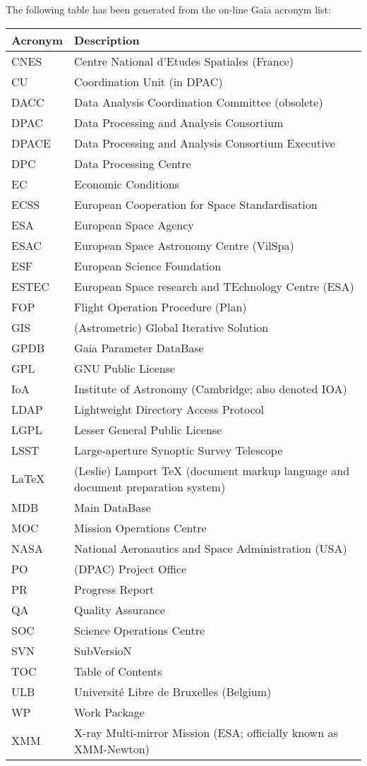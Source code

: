 The following table has been generated from the on-line Gaia acronym list:
\newline\newline%
\addtocounter{table}{-1}
\begin{longtable}{|l|p{}|}\hline 
\textbf{Acronym} & \textbf{Description}  \\\hline
CNES&Centre National d'Etudes Spatiales (France) \\\hline
CU&Coordination Unit (in DPAC) \\\hline
DACC&Data Analysis Coordination Committee (obsolete) \\\hline
DPAC&Data Processing and Analysis Consortium \\\hline
DPACE&Data Processing and Analysis Consortium Executive \\\hline
DPC&Data Processing Centre \\\hline
EC&Economic Conditions \\\hline
ECSS&European Cooperation for Space Standardisation \\\hline
ESA&European Space Agency \\\hline
ESAC&European Space Astronomy Centre (VilSpa) \\\hline
ESF&European Science Foundation \\\hline
ESTEC&European Space research and TEchnology Centre (ESA) \\\hline
FOP&Flight Operation Procedure (Plan) \\\hline
GIS&(Astrometric) Global Iterative Solution \\\hline
GPDB&Gaia Parameter DataBase \\\hline
GPL&GNU Public License \\\hline
IoA&Institute of Astronomy (Cambridge; also denoted IOA) \\\hline
LDAP&Lightweight Directory Access Protocol \\\hline
LGPL&Lesser General Public License \\\hline
LSST&Large-aperture Synoptic Survey Telescope \\\hline
LaTeX&(Leslie) Lamport TeX (document markup language and document preparation system) \\\hline
MDB&Main DataBase \\\hline
MOC&Mission Operations Centre \\\hline
NASA&National Aeronautics and Space Administration (USA) \\\hline
PO&(DPAC) Project Office \\\hline
PR&Progress Report \\\hline
QA&Quality Assurance \\\hline
SOC&Science Operations Centre \\\hline
SVN&SubVersioN \\\hline
TOC&Table of Contents \\\hline
ULB&Universit\'e Libre de Bruxelles (Belgium) \\\hline
WP&Work Package \\\hline
XMM&X-ray Multi-mirror Mission (ESA; officially known as XMM-Newton) \\\hline
\end{longtable} 
